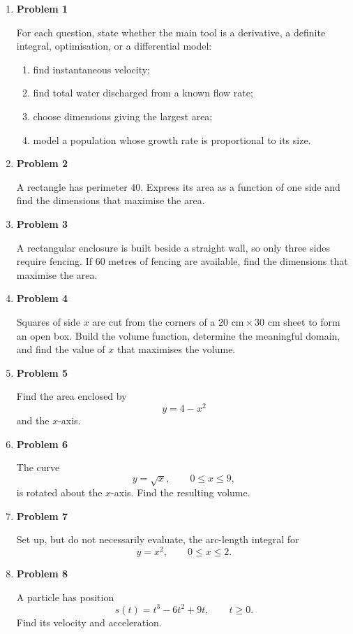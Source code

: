 \begin{enumerate}
\item \textbf{Problem 1}\par
For each question, state whether the main tool is a derivative, a definite integral, optimisation, or a differential model:
\begin{enumerate}
\item find instantaneous velocity;
\item find total water discharged from a known flow rate;
\item choose dimensions giving the largest area;
\item model a population whose growth rate is proportional to its size.
\end{enumerate}

\item \textbf{Problem 2}\par
A rectangle has perimeter \(40\). Express its area as a function of one side and find the dimensions that maximise the area.

\item \textbf{Problem 3}\par
A rectangular enclosure is built beside a straight wall, so only three sides require fencing. If \(60\) metres of fencing are available, find the dimensions that maximise the area.

\item \textbf{Problem 4}\par
Squares of side \(x\) are cut from the corners of a \(20\text{ cm}\times30\text{ cm}\) sheet to form an open box. Build the volume function, determine the meaningful domain, and find the value of \(x\) that maximises the volume.

\item \textbf{Problem 5}\par
Find the area enclosed by
\[
y=4-x^2
\]
and the \(x\)-axis.

\item \textbf{Problem 6}\par
The curve
\[
y=\sqrt{x},\qquad 0\le x\le9,
\]
is rotated about the \(x\)-axis. Find the resulting volume.

\item \textbf{Problem 7}\par
Set up, but do not necessarily evaluate, the arc-length integral for
\[
y=x^2,\qquad 0\le x\le2.
\]

\item \textbf{Problem 8}\par
A particle has position
\[
s(t)=t^3-6t^2+9t,\qquad t\ge0.
\]
Find its velocity and acceleration.


\end{enumerate}
